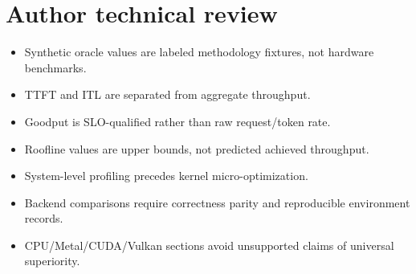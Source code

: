 \chapter*{Author technical review}
\begin{itemize}
\item Synthetic oracle values are labeled methodology fixtures, not hardware benchmarks.
\item TTFT and ITL are separated from aggregate throughput.
\item Goodput is SLO-qualified rather than raw request/token rate.
\item Roofline values are upper bounds, not predicted achieved throughput.
\item System-level profiling precedes kernel micro-optimization.
\item Backend comparisons require correctness parity and reproducible environment records.
\item CPU/Metal/CUDA/Vulkan sections avoid unsupported claims of universal superiority.
\end{itemize}